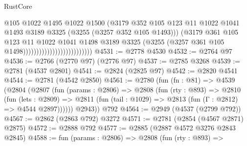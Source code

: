 \begin{lexlean}{RustCore}
\begin{coremodule}
                                                  @105
                                                  @1022
                                                  @1495
                                                  @1022
                                                  @1500
                                                  (@3179
                                                    @352
                                                    @105
                                                    @123
                                                    @11
                                                    @1022
                                                    @1041
                                                    @1493
                                                    @3189
                                                    @3325
                                                    (@3255 (@3257 @352 @105 @1493)))
                                                  (@3179
                                                    @361
                                                    @105
                                                    @123
                                                    @11
                                                    @1022
                                                    @1041
                                                    @1498
                                                    @3189
                                                    @3325
                                                    (@3255
                                                      (@3257
                                                        @361
                                                        @105
                                                        @1498))))))))))))))))))))))))))
@4531 := @2778 @4530
@4532 := @2764 @97
@4536 := @2766 (@2770 @97) (@2776 @97)
@4537 := @2785 @3268
@4539 := @2781 (@4537 @2801)
@4541 := @2824 (@2825 @97)
@4542 := @2820 @4541
@4544 := @2781 (@4542 @2850)
@4561 := @2780
    (fun (fn : @81) =>
    @4539
      (@2804
        (@2807
          (fun (params : @2806) =>
          @2808
            (fun (rty : @893) =>
            @2810
              (fun (lets : @2809) =>
              @2811 (fun (tail : @1029) => @2813 (fun (Γ : @2812) => @4544 @2897))))))
        @2943))
    @792
@4564 := @2949 (@4537 (@2799 @792))
@4567 := @2862 (@2863 @792) @3272
@4571 := @2781 (@2854 (@4567 @2871) @2875)
@4572 := @2888 @792
@4577 := @2885 (@2887 @4572 @3276 @2843 @2845)
@4588 := fun (params : @2806) =>
  @2808
    (fun (rty : @893) =>

\end{coremodule}
\end{lexlean}
